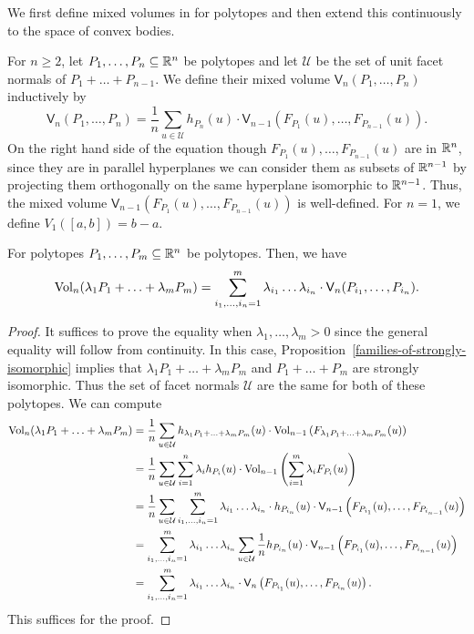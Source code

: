 \documentclass{puthesis-UG}
\begin{document}
We first define mixed volumes in for polytopes and then extend this continuously to the space of convex bodies. 

\begin{defn}
	For $n \geq 2$, let $P_1, \ldots, P_n \subseteq \mathbb{R}^n$ be polytopes and let $\mathcal{U}$ be the set of unit facet normals of $P_1 + \ldots + P_{n-1}$. We define their mixed volume $\mathsf{V}_n(P_1, \ldots, P_n)$ inductively by 
	\[
		\mathsf{V}_n(P_1, \ldots, P_n) = \frac{1}{n} \sum_{u \in \mathcal{U}} h_{P_n}(u) \cdot \mathsf{V}_{n-1} (F_{P_1}(u), \ldots, F_{P_{n-1}}(u)).
	\]
	On the right hand side of the equation though $F_{P_1}(u), \ldots, F_{P_{n-1}}(u)$ are in $\mathbb{R}^n$, since they are in parallel hyperplanes we can consider them as subsets of $\mathbb{R}^{n-1}$ by projecting them orthogonally on the same hyperplane isomorphic to $\mathbb{R}^{n-1}$. Thus, the mixed volume $\mathsf{V}_{n-1}(F_{P_1}(u), \ldots, F_{P_{n-1}}(u))$ is well-defined. For $n = 1$, we define $V_1 ([a, b]) = b-a$. 
\end{defn}

\begin{thm} \label{mixed-volume-polynomial-expansion}
	For polytopes $P_1, \ldots, P_m \subseteq \mathbb{R}^n$ be polytopes. Then, we have 
	\[
		\operatorname{Vol}_n(\lambda_1 P_1 + \ldots + \lambda_m P_m) = \sum_{i_1, \ldots, i_n = 1}^m \lambda_{i_1} \ldots \lambda_{i_n} \cdot \mathsf{V}_n (P_{i_1}, \ldots, P_{i_n}).
	\]
\end{thm}

\begin{proof}
	It suffices to prove the equality when $\lambda_1, \ldots, \lambda_m > 0$ since the general equality will follow from continuity. In this case, Proposition~\ref{families-of-strongly-isomorphic} implies that $\lambda_1 P_1 + \ldots + \lambda_m P_m$ and $P_1 + \ldots + P_m$ are strongly isomorphic. Thus the set of facet normals $\mathcal{U}$ are the same for both of these polytopes. We can compute 
	\begin{align*}
		\operatorname{Vol}_n (\lambda_1 P_1 + \ldots + \lambda_m P_m) & = \frac{1}{n} \sum_{u \in \mathcal{U}} h_{\lambda_1 P_1 + \ldots + \lambda_m P_m}(u) \cdot \operatorname{Vol}_{n-1} \left ( F_{\lambda_1 P_1 + \ldots + \lambda_m P_m} (u) \right ) \\
		& = \frac{1}{n} \sum_{u \in \mathcal{U}} \sum_{i = 1}^n \lambda_i h_{P_i}(u) \cdot \operatorname{Vol}_{n-1} \left ( \sum_{i = 1}^m \lambda_i F_{P_i}(u) \right ) \\
		& = \frac{1}{n} \sum_{u \in \mathcal{U}} \sum_{i_1, \ldots, i_n = 1}^m \lambda_{i_1} \ldots \lambda_{i_n} \cdot h_{P_{i_n}}(u) \cdot \mathsf{V}_{n-1} \left (F_{P_{i_1}}(u), \ldots, F_{P_{i_{n-1}}}(u) \right ) \\
		& = \sum_{i_1, \ldots, i_n = 1}^m \lambda_{i_1} \ldots \lambda_{i_n} \sum_{u \in \mathcal{U}} \frac{1}{n} h_{P_{i_n}}(u) \cdot \mathsf{V}_{n-1} \left (F_{P_{i_1}}(u), \ldots, F_{P_{i_{n-1}}}(u) \right ) \\
		& = \sum_{i_1, \ldots, i_n = 1}^m \lambda_{i_1} \ldots \lambda_{i_n} \cdot \mathsf{V}_n \left (F_{P_{i_1}}(u), \ldots, F_{P_{i_{n}}}(u) \right ). 
	\end{align*}
	This suffices for the proof. 
\end{proof}
\end{document}
